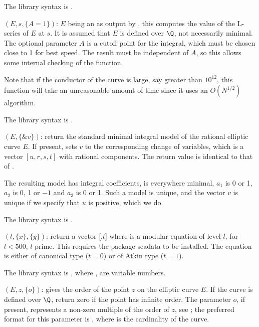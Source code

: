 The library syntax is .

$(E,s,\{A=1\})$: \label{se:elllseries}
$E$ being an  as output by
, this computes the value of the L-series of $E$ at $s$. It is
assumed that $E$ is defined over $\Q$, not necessarily minimal. The optional
parameter $A$ is a cutoff point for the integral, which must be chosen close
to 1 for best speed. The result must be independent of $A$, so this allows
some internal checking of the function.

Note that if the conductor of the curve is large, say greater than $10^{12}$,
this function will take an unreasonable amount of time since it uses an
$O(N^{1/2})$ algorithm.

The library syntax is .

$(E,\{\&v\})$: \label{se:ellminimalmodel}return the standard minimal integral model of the rational elliptic
curve $E$. If present, sets $v$ to the corresponding change of variables,
which is a vector $[u,r,s,t]$ with rational components. The return value is
identical to that of .

The resulting model has integral coefficients, is everywhere minimal, $a_1$
is 0 or 1, $a_2$ is 0, 1 or $-1$ and $a_3$ is 0 or 1. Such a model is
unique, and the vector $v$ is unique if we specify that $u$ is positive,
which we do. 

The library syntax is .

$(l,\{x\},\{y\})$: \label{se:ellmodulareqn}return a vector [,$t$] where  is a modular equation of
level $l$, for $l<500$, $l$ prime. This requires the package seadata to be
installed. The equation is either of canonical type ($t=0$) or of Atkin type
($t=1$).

The library syntax is , where ,  are variable numbers.

$(E,z,\{o\})$: \label{se:ellorder}
gives the order of the point $z$ on the elliptic
curve $E$. If the curve is defined over $\Q$, return zero if the point has
infinite order. The parameter $o$, if present, represents a non-zero
multiple of the order of $z$, see ; the preferred format for
this parameter is , where  is the
cardinality of the curve.

